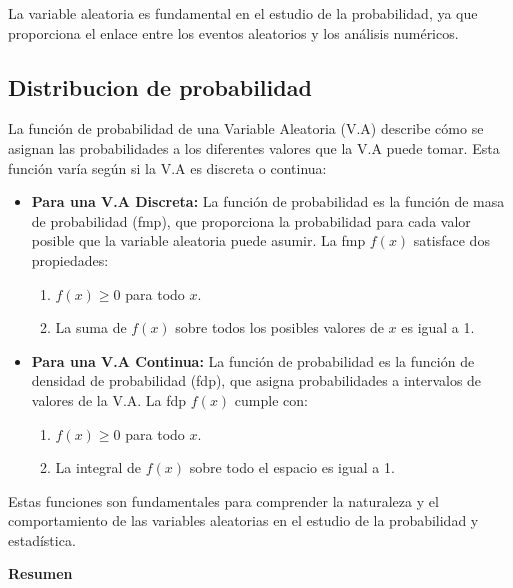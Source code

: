 \documentclass{article}
\begin{document}
La variable aleatoria es fundamental en el estudio de la probabilidad, ya que proporciona el enlace entre los eventos aleatorios y los análisis numéricos.

\subsection{Distribucion de probabilidad}

La función de probabilidad de una Variable Aleatoria (V.A) describe cómo se asignan las probabilidades a los diferentes valores que la V.A puede tomar. Esta función varía según si la V.A es discreta o continua:

\begin{itemize}
    \item \textbf{Para una V.A Discreta:} La función de probabilidad es la función de masa de probabilidad (fmp), que proporciona la probabilidad para cada valor posible que la variable aleatoria puede asumir. La fmp \( f(x) \) satisface dos propiedades:
          \begin{enumerate}
              \item \( f(x) \geq 0 \) para todo \( x \).
              \item La suma de \( f(x) \) sobre todos los posibles valores de \( x \) es igual a 1.
          \end{enumerate}
    \item \textbf{Para una V.A Continua:} La función de probabilidad es la función de densidad de probabilidad (fdp), que asigna probabilidades a intervalos de valores de la V.A. La fdp \( f(x) \) cumple con:
          \begin{enumerate}
              \item \( f(x) \geq 0 \) para todo \( x \).
              \item La integral de \( f(x) \) sobre todo el espacio es igual a 1.
          \end{enumerate}
\end{itemize}

Estas funciones son fundamentales para comprender la naturaleza y el comportamiento de las variables aleatorias en el estudio de la probabilidad y estadística.

\textbf{Resumen}
\end{document}
